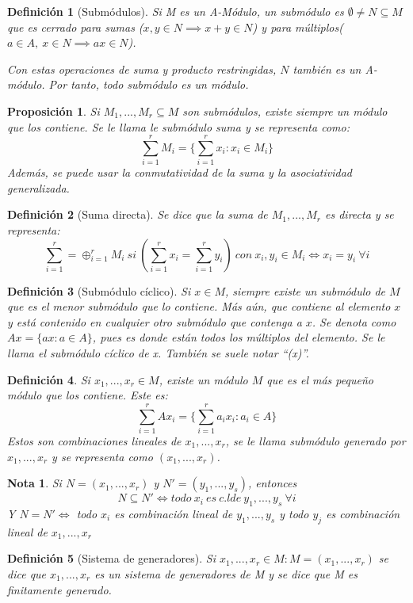 \documentclass[11pt, a4paper, titlepage]{article}
\theoremstyle{theorem-style}
\newtheorem*{nprop}{Proposición}
\theoremstyle{definition-style}
\newtheorem*{ndef}{Definición}
\theoremstyle{remark-style}
\newtheorem*{nota}{Nota}
\theoremstyle{example-style}
\begin{document}
\begin{ndef}[Submódulos]
	Si M es un A-Módulo, un submódulo es $\emptyset \ne N \subseteq M$ que es cerrado para sumas ($x,y\in N \implies x+y \in N$) y para múltiplos($a\in A,\ x\in N \implies ax\in N$).
	
	Con estas operaciones de suma y producto restringidas, $N$ también es un A-módulo. Por tanto, todo submódulo es un módulo.
\end{ndef}
\begin{nprop}
	Si $M_1,...,M_r \subseteq M$ son submódulos, existe siempre un módulo que los contiene. Se le llama le submódulo suma y se representa como:
	\[
	\sum_{i=1}^r M_i =\{\sum_{i=1}^r x_i : x_i \in M_i\}
	\]
	Además, se puede usar la conmutatividad de la suma y la asociatividad generalizada.

\end{nprop}
\begin{ndef}[Suma directa]
	Se dice que la suma de $M_1,...,M_r$ es directa y se representa:
	\[
	\sum_{i=1}^r = \oplus_{i=1}^r M_i \ si \ (\sum_{i=1}^r x_i =  \sum_{i=1}^r y_i) \ con \ x_i,y_i \in M_i \iff x_i = y_i\ \forall i	\]
\end{ndef}
\begin{ndef}[Submódulo cíclico]
	Si $x\in M$, siempre existe un submódulo de $M$ que es el menor submódulo que lo contiene. Más aún, que contiene al elemento $x$ y está contenido en cualquier otro submódulo que contenga a $x$. Se denota como $Ax = \{ax : a \in A\}$, pues es donde están todos los múltiplos del elemento. Se le llama el submódulo cíclico de x. También se suele notar “(x)”.
\end{ndef}
\begin{ndef}
	Si $x_1,...,x_r \in M$, existe un módulo $M$ que es el más pequeño módulo que los contiene. Este es:
	\[
	\sum_{i=1}^r Ax_i = \{\sum_{i=1}^r a_ix_i : a_i \in A\}
	\]
	Estos son combinaciones lineales de $x_1,...,x_r$, se le llama submódulo generado por $x_1,...,x_r$ y se representa como $(x_1,...,x_r)$.
\end{ndef}
\begin{nota}
	Si $N=(x_1,...,x_r)$ y $N'= (y_1,...,y_s)$, entonces
	\[
	N \subseteq N' \iff todo\ x_i \ es \ c.l de \ y_1,...,y_s \ \forall i
	\]
	Y $N=N'\iff$ todo $x_i$ es combinación lineal de $y_1,...,y_s$ y todo $y_j$ es combinación lineal de $x_1,...,x_r$
\end{nota}
\begin{ndef}[Sistema de generadores]
	Si $x_1,...,x_r\in M : M = (x_1,...,x_r)$ se dice que $x_1,...,x_r$ es un sistema de generadores de M  y se dice que M es finitamente generado.
\end{ndef}
\end{document}
